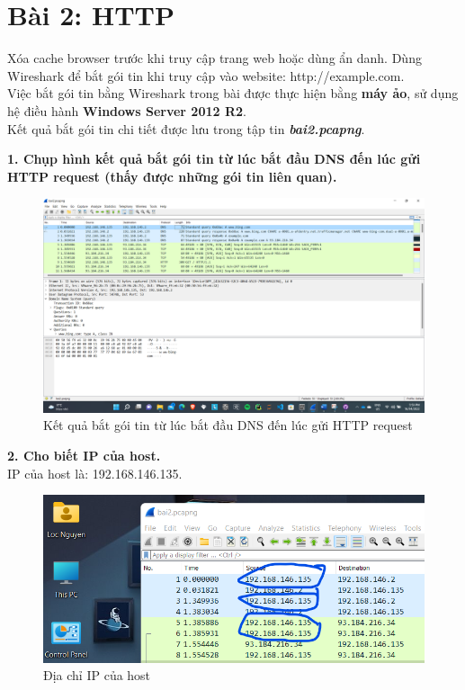 \section{Bài 2: HTTP}
Xóa cache browser trước khi truy cập trang web hoặc dùng ẩn danh. Dùng Wireshark để bắt gói tin khi truy cập vào website: http://example.com.\\
Việc bắt gói tin bằng Wireshark trong bài được thực hiện bằng \textbf{máy ảo}, sử dụng hệ điều hành \textbf{Windows Server 2012 R2}.\\
Kết quả bắt gói tin chi tiết được lưu trong tập tin \textbf{\textit{bai2.pcapng}}.

\textbf{1. Chụp hình kết quả bắt gói tin từ lúc bắt đầu DNS đến lúc gửi HTTP request (thấy được những gói tin liên quan).}
\begin{figure}[H]
\begin{center}
\includegraphics[scale=.45]{../figures/p2/p2_intro}
\end{center}
\caption{Kết quả bắt gói tin từ lúc bắt đầu DNS đến lúc gửi HTTP request}
\end{figure}

\textbf{2.	Cho biết IP của host.}\\
IP của host là: 192.168.146.135.
\begin{figure}[H]
\begin{center}
\includegraphics[scale=1]{../figures/p2/p2_hostip}
\end{center}
\caption{Địa chỉ IP của host}
\end{figure}

